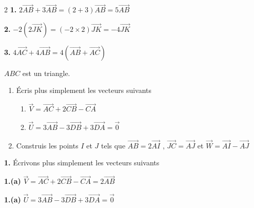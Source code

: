 \begin{multicols*}{2}
  	\textbf{1.} $2\overrightarrow{AB}+ 3\overrightarrow{AB}=(2+3)\overrightarrow{AB}=5\overrightarrow{AB}$
  	
  	\textbf{2.} $-2\left(2\overrightarrow{JK}\right)=(-2 \times 2)\overrightarrow{JK}=-4\overrightarrow{JK}$
  	
  	\textbf{3.} $4\overrightarrow{AC}+ 4\overrightarrow{AB}=4\left(\overrightarrow{AB}+\overrightarrow{AC}\right)$
  	
  	
  	
  	$ABC$ est un triangle.
  	\begin{enumerate}
  		\item Écris plus simplement les vecteurs suivants  
  		\begin{enumerate}
  			\item $\overrightarrow{V}=\overrightarrow{AC}+2\overrightarrow{CB}-\overrightarrow{CA}$
  			\item $\overrightarrow{U}=3\overrightarrow{AB}-3\overrightarrow{DB}+3\overrightarrow{DA}=\overrightarrow{0}$
  		\end{enumerate}
  		\item  Construis les points $I$ et $J$ tels que $\overrightarrow{AB}=2\overrightarrow{AI}$ , $\overrightarrow{JC}=\overrightarrow{AJ}$
  		et $\overrightarrow{W}=\overrightarrow{AI}-\overrightarrow{AJ}$
  	\end{enumerate}
  	\dure
  	\resul
  	\textbf{1.} Écrivons plus simplement les vecteurs suivants
  	
  	\textbf{1.(a)} $\overrightarrow{V}=\overrightarrow{AC}+2\overrightarrow{CB}-\overrightarrow{CA}=2\overrightarrow{AB}$
  	
  	\textbf{1.(a)} $\overrightarrow{U}=3\overrightarrow{AB}-3\overrightarrow{DB}+3\overrightarrow{DA}=\overrightarrow{0}$
  	

\end{multicols*}
